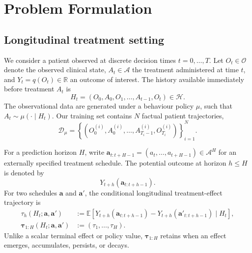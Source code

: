 
\section{Problem Formulation}
\label{sec:formulation}

\subsection{Longitudinal treatment setting}

We consider a patient observed at discrete decision times
$t=0,\ldots,T$. Let $O_t\in\mathcal O$ denote the observed clinical
state, $A_t\in\mathcal A$ the treatment administered at time $t$, and
$Y_t=q(O_t)\in\mathbb R$ an outcome of interest. The history available
immediately before treatment $A_t$ is
\begin{equation}
    H_t=(O_0,A_0,O_1,\ldots,A_{t-1},O_t)\in\mathcal H.
    \label{eq:history}
\end{equation}
The observational data are generated under a behaviour policy $\mu$,
such that $A_t\sim\mu(\cdot\mid H_t)$. Our training set contains $N$
factual patient trajectories,
\begin{equation}
    \mathcal D_\mu
    =\left\{
    (O^{(i)}_0,A^{(i)}_0,\ldots,A^{(i)}_{T_i-1},O^{(i)}_{T_i})
    \right\}_{i=1}^{N}.
    \label{eq:dataset}
\end{equation}

For a prediction horizon $H$, write
$\bm a_{t:t+H-1}=(a_t,\ldots,a_{t+H-1})\in\mathcal A^H$ for an
externally specified treatment schedule. The potential outcome at
horizon $h\leq H$ is denoted by
\begin{equation}
    Y_{t+h}(\bm a_{t:t+h-1}).
    \label{eq:potential-outcome}
\end{equation}
For two schedules $\bm a$ and $\bm a'$, the conditional longitudinal
treatment-effect trajectory is
\begin{align}
    \tau_h(H_t;\bm a,\bm a')
    &:=
    \mathbb E\!\left[
        Y_{t+h}(\bm a_{t:t+h-1})
        -Y_{t+h}(\bm a'_{t:t+h-1})
        \mid H_t
    \right],
    \label{eq:true-effect}\\
    \bm\tau_{1:H}(H_t;\bm a,\bm a')
    &:= (\tau_1,\ldots,\tau_H).
    \label{eq:true-effect-trajectory}
\end{align}
Unlike a scalar terminal effect or policy value,
$\bm\tau_{1:H}$ retains when an effect emerges, accumulates, persists,
or decays.

